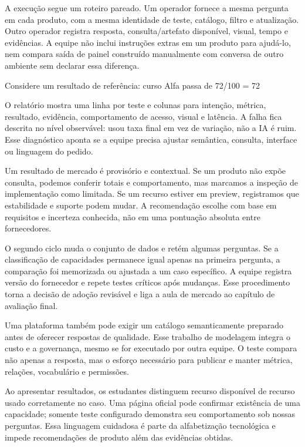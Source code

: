 A execução segue um roteiro pareado. Um operador fornece a mesma pergunta em cada produto, com a mesma identidade de teste, catálogo, filtro e atualização. Outro operador registra resposta, consulta/artefato disponível, visual, tempo e evidências. A equipe não inclui instruções extras em um produto para ajudá-lo, nem compara saída de painel construído manualmente com conversa de outro ambiente sem declarar essa diferença.

Considere um resultado de referência: curso Alfa passa de 72/100 = 72%

O relatório mostra uma linha por teste e colunas para intenção, métrica, resultado, evidência, comportamento de acesso, visual e latência. A falha fica descrita no nível observável: usou taxa final em vez de variação, não a IA é ruim. Esse diagnóstico aponta se a equipe precisa ajustar semântica, consulta, interface ou linguagem do pedido.

Um resultado de mercado é provisório e contextual. Se um produto não expõe consulta, podemos conferir totais e comportamento, mas marcamos a inspeção de implementação como limitada. Se um recurso estiver em preview, registramos que estabilidade e suporte podem mudar. A recomendação escolhe com base em requisitos e incerteza conhecida, não em uma pontuação absoluta entre fornecedores.

O segundo ciclo muda o conjunto de dados e retém algumas perguntas. Se a classificação de capacidades permanece igual apenas na primeira pergunta, a comparação foi memorizada ou ajustada a um caso específico. A equipe registra versão do fornecedor e repete testes críticos após mudanças. Esse procedimento torna a decisão de adoção revisável e liga a aula de mercado ao capítulo de avaliação final.

Uma plataforma também pode exigir um catálogo semanticamente preparado antes de oferecer respostas de qualidade. Esse trabalho de modelagem integra o custo e a governança, mesmo se for executado por outra equipe. O teste compara não apenas a resposta, mas o esforço necessário para publicar e manter métrica, relações, vocabulário e permissões.

Ao apresentar resultados, os estudantes distinguem recurso disponível de recurso usado corretamente no caso. Uma página oficial pode confirmar existência de uma capacidade; somente teste configurado demonstra seu comportamento sob nossas perguntas. Essa linguagem cuidadosa é parte da alfabetização tecnológica e impede recomendações de produto além das evidências obtidas.



